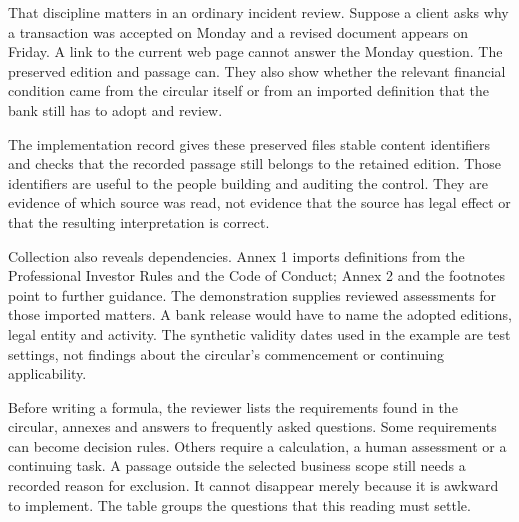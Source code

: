 That discipline matters in an ordinary incident review. Suppose a client asks
why a transaction was accepted on Monday and a revised document appears on
Friday. A link to the current web page cannot answer the Monday question. The
preserved edition and passage can. They also show whether the relevant financial
condition came from the circular itself or from an imported definition that the
bank still has to adopt and review.

The implementation record gives these preserved files stable content
identifiers and checks that the recorded passage still belongs to the retained
edition. Those identifiers are useful to the people building and auditing the
control. They are evidence of which source was read, not evidence that the source
has legal effect or that the resulting interpretation is correct.

Collection also reveals dependencies. Annex 1 imports definitions from the
Professional Investor Rules and the Code of Conduct; Annex 2 and the footnotes
point to further guidance. The demonstration supplies reviewed assessments for
those imported matters. A bank release would have to name the adopted editions,
legal entity and activity. The synthetic validity dates used in the example are
test settings, not findings about the circular's commencement or continuing
applicability.

Before writing a formula, the reviewer lists the requirements found in the
circular, annexes and answers to frequently asked questions. Some requirements
can become decision rules. Others require a calculation, a human assessment or
a continuing task. A passage outside the selected business scope still needs a
recorded reason for exclusion. It cannot disappear merely because it is awkward
to implement. The table groups the questions that this reading must settle.

